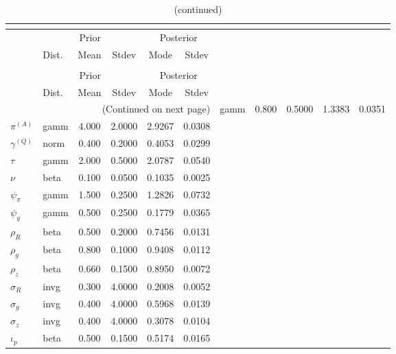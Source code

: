  
\begin{center}
\begin{longtable}{llcccc} 
\caption{Results from posterior maximization (parameters)}\\
 \label{Table:Posterior:1}\\
\toprule 
  & \multicolumn{3}{c}{Prior}  &  \multicolumn{2}{c}{Posterior} \\
  \cmidrule(r{.75em}){2-4} \cmidrule(r{.75em}){5-6}
  & Dist. & Mean  & Stdev & Mode & Stdev \\ 
\midrule \endfirsthead 
\caption{(continued)}\\
 \bottomrule 
  & \multicolumn{3}{c}{Prior}  &  \multicolumn{2}{c}{Posterior} \\
  \cmidrule(r{.75em}){2-4} \cmidrule(r{.75em}){5-6}
  & Dist. & Mean  & Stdev & Mode & Stdev \\ 
\midrule \endhead 
\bottomrule \multicolumn{6}{r}{(Continued on next page)}\endfoot 
\bottomrule\endlastfoot 
${r_{A}}$ & gamm &   0.800 & 0.5000 &   1.3383 &  0.0351 \\ 
${\pi^{(A)}}$ & gamm &   4.000 & 2.0000 &   2.9267 &  0.0308 \\ 
${\gamma^{(Q)}}$ & norm &   0.400 & 0.2000 &   0.4053 &  0.0299 \\ 
${\tau}$ & gamm &   2.000 & 0.5000 &   2.0787 &  0.0540 \\ 
${\nu}$ & beta &   0.100 & 0.0500 &   0.1035 &  0.0025 \\ 
${\psi_\pi}$ & gamm &   1.500 & 0.2500 &   1.2826 &  0.0732 \\ 
${\psi_y}$ & gamm &   0.500 & 0.2500 &   0.1779 &  0.0365 \\ 
${\rho_R}$ & beta &   0.500 & 0.2000 &   0.7456 &  0.0131 \\ 
${\rho_{g}}$ & beta &   0.800 & 0.1000 &   0.9408 &  0.0112 \\ 
${\rho_z}$ & beta &   0.660 & 0.1500 &   0.8950 &  0.0072 \\ 
${\sigma_R}$ & invg &   0.300 & 4.0000 &   0.2008 &  0.0052 \\ 
${\sigma_{g}}$ & invg &   0.400 & 4.0000 &   0.5968 &  0.0139 \\ 
${\sigma_z}$ & invg &   0.400 & 4.0000 &   0.3078 &  0.0104 \\ 
${\iota_p}$ & beta &   0.500 & 0.1500 &   0.5174 &  0.0165 \\ 
\end{longtable}
 \end{center}
